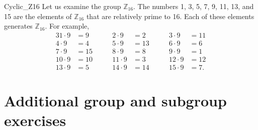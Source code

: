  
\begin{example}{Cyclic_Z16}
Let us examine the group ${\mathbb Z}_{16}$.  The numbers 1, 3, 5, 7, 9,
11, 13, and 15 are the elements of ${\mathbb Z}_{16}$ that are relatively
prime to 16.  Each of these elements generates ${\mathbb Z}_{16}$. For
example, 
\begin{alignat*}{3}
1 \cdot 9  & =  9  & \qquad 2 \cdot 9  & = 2  & \qquad 3 \cdot 9  & = 11 \\
4 \cdot 9  & =  4  & \qquad 5 \cdot 9  & = 13 & \qquad	6 \cdot 9 & = 6  \\
7 \cdot 9  & =  15 & \qquad 8 \cdot 9  & = 8  & \qquad	9 \cdot 9 &  = 1  \\
10 \cdot 9 & =  10 & \qquad 11 \cdot 9 & = 3  & \qquad	12 \cdot 9 &  = 12 \\
13 \cdot 9 & =  5 &  \qquad 14 \cdot 9 & = 14 &  \qquad	15 \cdot 9 & = 7.
\end{alignat*}
\end{example}



\section{Additional group and subgroup exercises}
\exrule

